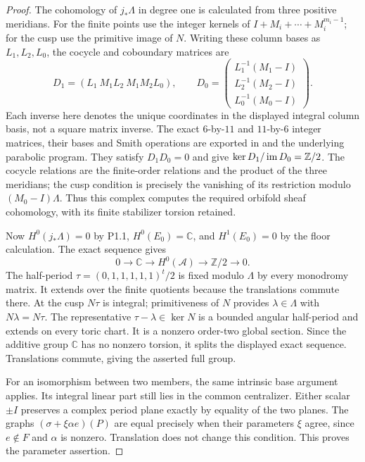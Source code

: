 \begin{proof}
The cohomology of $j_*\Lambda$ in degree one is calculated
from three positive meridians. For the finite points use
the integer kernels of $I+M_i+\cdots+M_i^{m_i-1}$;
for the cusp use the primitive image of $N$.
Writing these column bases as $L_1,L_2,L_0$, the cocycle
and coboundary matrices are
\[
D_1=(L_1\ M_1L_2\ M_1M_2L_0),\qquad
D_0=\begin{pmatrix}L_1^{-1}(M_1-I)\\
L_2^{-1}(M_2-I)\\L_0^{-1}(M_0-I)\end{pmatrix}.
\]
Each inverse here denotes the unique coordinates in the
displayed integral column basis, not a square matrix
inverse. The exact $6$-by-$11$ and $11$-by-$6$ integer
matrices, their bases and Smith operations are exported
in  and the
underlying parabolic program. They satisfy $D_1D_0=0$ and
give $\ker D_1/\operatorname{im} D_0=\mathbb Z/2$. The cocycle relations
are the finite-order relations and the product of the
three meridians; the cusp condition is precisely the
vanishing of its restriction modulo $(M_0-I)\Lambda$.
Thus this complex computes the required orbifold sheaf
cohomology, with its finite stabilizer torsion retained.

Now $H^0(j_*\Lambda)=0$ by P1.1,
$H^0(E_0)=\mathbb C$, and $H^1(E_0)=0$ by the floor
calculation. The exact sequence gives
\[
0\to\mathbb C\to H^0(\mathcal A)\to\mathbb Z/2\to0.
\]
The half-period
$\tau=(0,1,1,1,1,1)^t/2$ is fixed modulo $\Lambda$
by every monodromy matrix. It extends over the finite
quotients because the translations commute there.
At the cusp $N\tau$ is integral; primitiveness of $N$
provides $\lambda\in\Lambda$ with $N\lambda=N\tau$.
The representative $\tau-\lambda\in\ker N$ is a bounded
angular half-period and extends on every toric chart.
It is a nonzero order-two global section. Since the
additive group $\mathbb C$ has no nonzero torsion, it
splits the displayed exact sequence. Translations
commute, giving the asserted full group.

For an isomorphism between two members, the same intrinsic
base argument applies. Its integral linear part still
lies in the common centralizer. Either scalar $\pm I$
preserves a complex period plane exactly by equality
of the two planes. The graphs
$(\sigma+\xi\alpha e)(P)$ are equal precisely when their
parameters $\xi$ agree, since $e\notin F$ and $\alpha$
is nonzero. Translation does not change this condition.
This proves the parameter assertion.
\end{proof}
